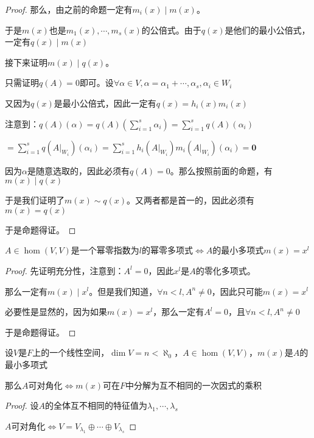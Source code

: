 \documentclass[12pt, a4paper, oneside, UTF8]{ctexbook}
\begin{document}
\begin{para}{0}
\begin{proof}
						那么，由之前的命题一定有$m_i(x) \mid m(x)$。

						于是$m(x)$也是$m_1(x),\cdots,m_s(x)$的公倍式。由于$q(x)$是他们的最小公倍式，一定有$q(x) \mid m(x)$

						接下来证明$m(x) \mid q(x)$。

						只需证明$q(A)=0$即可。设$\forall \alpha \in V,\alpha =\alpha_1+\cdots,\alpha_s,\alpha_i \in W_i$
						
						又因为$q(x)$是最小公倍式，因此一定有$q(x)=h_i(x)m_i(x)$

						注意到：$q(A)(\alpha )=q(A)\left(\sum\limits_{i=1}^{s} \alpha_i\right)=\sum\limits_{i=1}^{s}q(A)\left( \alpha_i\right)$

						$=\sum\limits_{i=1}^{s}q(A|_{W_i})\left( \alpha_i\right)=\sum\limits_{i=1}^{s}h_i(A|_{W_i})m_i(A|_{W_i})\left( \alpha_i\right)=\mathbf{0}$

						因为$\alpha $是随意选取的，因此必须有$q(A)=0$。那么按照前面的命题，有$m(x) \mid q(x)$

						于是我们证明了$m(x) \sim q(x)$。又两者都是首一的，因此必须有$m(x)=q(x)$

						于是命题得证。
					\end{proof}
				\point{}
					\begin{proposition}
						$A \in \hom(V,V)$是一个幂零指数为$l$的幂零多项式$\Leftrightarrow A$的最小多项式$m(x)=x^l$
					\end{proposition}
					\begin{proof}
						先证明充分性，注意到：$A^l=0$，因此$x^l$是$A$的零化多项式。

						那么一定有$m(x) \mid x^l$。但是我们知道，$\forall n < l,A^n \neq 0$，因此只可能$m(x)=x^l$

						必要性是显然的，因为如果$m(x)=x^l$，那么一定有$A^l=0$，且$\forall n < l,A^n \neq 0$

						于是命题得证。
					\end{proof}
				\point{}
					\begin{proposition}
						设$V$是$F$上的一个线性空间，$\dim V = n < \aleph_0$，$A \in \hom(V,V)$，$m(x)$是$A$的最小多项式

						那么$A$可对角化$\Leftrightarrow m(x)$可在$F$中分解为互不相同的一次因式的乘积
					\end{proposition}
					\begin{proof}
						设$A$的全体互不相同的特征值为$\lambda_1,\cdots,\lambda_s$

						$A$可对角化$\Leftrightarrow V = V_{\lambda_1} \oplus \cdots \oplus V_{\lambda_s}$


\end{proof}
\end{para}
\end{document}
